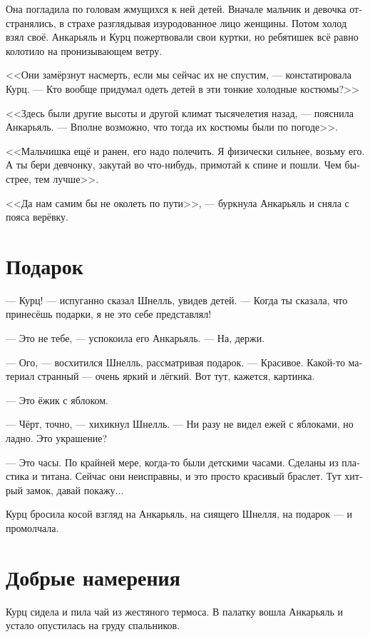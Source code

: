\documentclass[a4paper,12pt,fleqn]{book}\usepackage{polyglossia}\setdefaultlanguage[babelshorthands=true]{russian}\setotherlanguage{english}\defaultfontfeatures{Ligatures=TeX,Mapping=tex-text}\usepackage{xcolor}\newcommand{\ml}[3]{#2}
\begin{document}
Она погладила по головам жмущихся к ней детей.
Вначале мальчик и девочка отстранялись, в страхе разглядывая изуродованное лицо женщины.
Потом холод взял своё.
Анкарьяль и Курц пожертвовали свои куртки, но ребятишек всё равно колотило на пронизывающем ветру.

<<Они замёрзнут насмерть, если мы сейчас их не спустим, --- констатировала Курц.
--- Кто вообще придумал одеть детей в эти тонкие холодные костюмы?>>

<<Здесь были другие высоты и другой климат тысячелетия назад, --- пояснила Анкарьяль.
--- Вполне возможно, что тогда их костюмы были по погоде>>.

<<Мальчишка ещё и ранен, его надо полечить.
Я физически сильнее, возьму его.
А ты бери девчонку, закутай во что-нибудь, примотай к спине и пошли.
Чем быстрее, тем лучше>>.

<<Да нам самим бы не околеть по пути>>, --- буркнула Анкарьяль и сняла с пояса верёвку.

\section{Подарок}

--- Курц! --- испуганно сказал Шнелль, увидев детей.
--- Когда ты сказала, что принесёшь подарки, я не это себе представлял!

--- Это не тебе, --- успокоила его Анкарьяль.
--- На, держи.

--- Ого, --- восхитился Шнелль, рассматривая подарок.
--- Красивое.
Какой-то материал странный --- очень яркий и лёгкий.
Вот тут, кажется, картинка.

--- Это ёжик с яблоком.

--- Чёрт, точно, --- хихикнул Шнелль.
--- Ни разу не видел ежей с яблоками, но ладно.
Это украшение?

--- Это часы.
По крайней мере, когда-то были детскими часами.
Сделаны из пластика и титана.
Сейчас они неисправны, и это просто красивый браслет.
Тут хитрый замок, давай покажу...

Курц бросила косой взгляд на Анкарьяль, на сиящего Шнелля, на подарок --- и промолчала.

\section{Добрые намерения}

Курц сидела и пила чай из жестяного термоса.
В палатку вошла Анкарьяль и устало опустилась на груду спальников.
\end{document}
